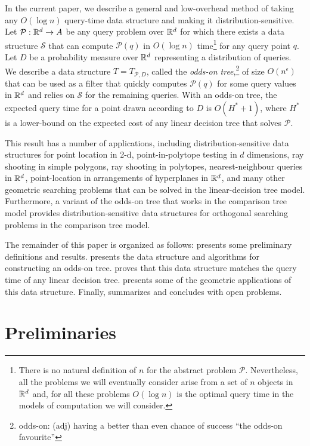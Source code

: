 \documentclass{patmorin}
\newcommand{\eps}{\epsilon}
\begin{document}
In the current paper, we describe a general and low-overhead method
of taking any $O(\log n)$ query-time data structure and making it
distribution-sensitive.  Let $\mathcal{P}:\mathbb{R}^d\rightarrow A$ be any query
problem over $\mathbb{R}^d$ for which there exists a data structure $\mathcal{S}$
that can compute $\mathcal{P}(q)$ in $O(\log n)$ time\footnote{There
is no natural definition of $n$ for the abstract problem $\mathcal{P}$.
Nevertheless, all the problems we will eventually consider arise from a
set of $n$ objects in $\mathbb{R}^d$ and, for all these problems $O(\log n)$ is
the optimal query time in the models of computation we will consider.}
for any query point $q$.  Let $D$ be a probability measure over $\mathbb{R}^d$
representing a distribution of queries.  We describe a data structure
$T=T_{\mathcal{P},D}$, called the \emph{odds-on tree},\footnote{odds-on:
(adj) having a better than even chance of success ``the odds-on
favourite''}  of size $O(n^\eps)$ that can be used as a filter that
quickly computes $\mathcal{P}(q)$ for some query values in $\mathbb{R}^d$ and
relies on $\mathcal{S}$ for the remaining queries.  With an odds-on tree,
the expected query time for a point drawn according to $D$ is $O(H^*+1)$,
where $H^*$ is a lower-bound on the expected cost of any linear decision
tree that solves $\mathcal{P}$.

This result has a number of applications, including distribution-sensitive
data structures for point location in 2-d, point-in-polytope testing
in $d$ dimensions, ray shooting in simple polygons, ray shooting
in polytopes, nearest-neighbour queries in $\mathbb{R}^d$, point-location
in arrangements of hyperplanes in $\mathbb{R}^d$, and many other geometric
searching problems that can be solved in the linear-decision tree model.
Furthermore, a variant of the odds-on tree that works in the comparison
tree model provides distribution-sensitive data structures for orthogonal
searching problems in the comparison tree model.

The remainder of this paper is organized as follows: 
presents some preliminary definitions and results. 
presents the data structure and algorithms for constructing an odds-on
tree.   proves that this data structure matches the
query time of any linear decision tree.   presents
some of the geometric applications of this data structure. Finally,
 summarizes and concludes with open problems.

\section{Preliminaries}
\end{document}
